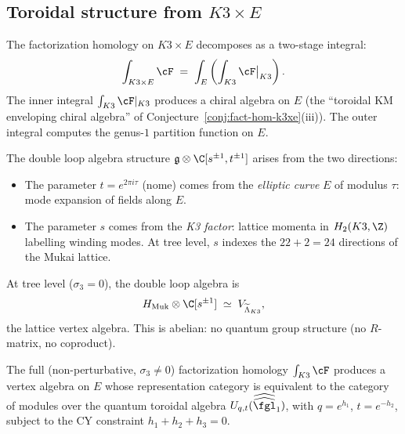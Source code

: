 \subsection{Toroidal structure from \texorpdfstring{$K3 \times E$}{K3 x E}}
\label{subsec:toroidal-from-k3xe}

The factorization homology on $K3 \times E$ decomposes as a two-stage integral:
\begin{equation}\label{eq:two-stage-fh}
 \int_{K3 \times E} \cF
 \;=\;
 \int_E \left(\int_{K3} \cF\big|_{K3}\right).
\end{equation}
The inner integral $\int_{K3} \cF|_{K3}$ produces a chiral algebra on $E$ (the ``toroidal KM enveloping chiral algebra'' of Conjecture~\ref{conj:fact-hom-k3xe}(iii)).
The outer integral computes the genus-$1$ partition function on $E$.

The double loop algebra structure $\mathfrak{g} \otimes \C[s^{\pm 1}, t^{\pm 1}]$ arises from the two directions:
\begin{itemize}
\item The parameter $t = e^{2\pi i \tau}$ (nome) comes from the \emph{elliptic curve} $E$ of modulus $\tau$: mode expansion of fields along $E$.
\item The parameter $s$ comes from the \emph{K3 factor}: lattice momenta in $H_2(K3, \Z)$ labelling winding modes.
At tree level, $s$ indexes the $22 + 2 = 24$ directions of the Mukai lattice.
\end{itemize}
At tree level ($\sigma_3 = 0$), the double loop algebra is
\begin{equation}\label{eq:double-loop-tree}
 H_{\mathrm{Muk}} \otimes \C[s^{\pm 1}]
 \;\simeq\;
 V_{\widetilde{\Lambda}_{K3}},
\end{equation}
the lattice vertex algebra.
This is abelian: no quantum group structure (no $R$-matrix, no coproduct).

\begin{conjecture}
\label{conj:toroidal-km-from-fh}
\ClaimStatusConjectured
The full (non-perturbative, $\sigma_3 \neq 0$) factorization homology $\int_{K3} \cF$ produces a vertex algebra on $E$ whose representation category is equivalent to the category of modules over the quantum toroidal algebra $U_{q,t}(\widehat{\widehat{\fgl}}_1)$, with $q = e^{h_1}$, $t = e^{-h_2}$, subject to the CY constraint $h_1 + h_2 + h_3 = 0$.
\end{conjecture}

